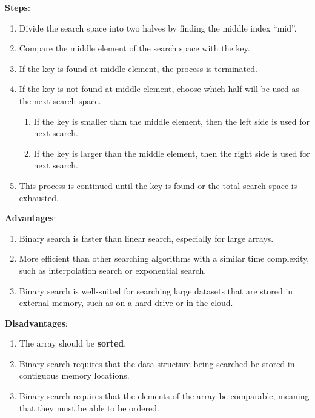 \textbf{Steps}:
\begin{enumerate}
    \item Divide the search space into two halves by finding the middle index “mid”.
    \item Compare the middle element of the search space with the key.
    \item If the key is found at middle element, the process is terminated.
    \item If the key is not found at middle element, choose which half will be used as the next search space.
    \begin{enumerate}
        \item If the key is smaller than the middle element, then the left side is used for next search.
        \item If the key is larger than the middle element, then the right side is used for next search.
    \end{enumerate}
    \item This process is continued until the key is found or the total search space is exhausted.
\end{enumerate}

\begin{table}[h]
    \begin{minipage}[t]{0.48\linewidth}
        \textbf{Advantages}:
        \begin{enumerate}
            \item Binary search is faster than linear search, especially for large arrays.
            \item More efficient than other searching algorithms with a similar time complexity, such as interpolation search or exponential search.
            \item Binary search is well-suited for searching large datasets that are stored in external memory, such as on a hard drive or in the cloud.
        \end{enumerate}
    \end{minipage}
    \hfill
    \begin{minipage}[t]{0.48\linewidth}
        \textbf{Disadvantages}:
        \begin{enumerate}
            \item The array should be \textbf{sorted}.
            \item Binary search requires that the data structure being searched be stored in contiguous memory locations. 
            \item Binary search requires that the elements of the array be comparable, meaning that they must be able to be ordered.
        \end{enumerate}
    \end{minipage}
\end{table}

